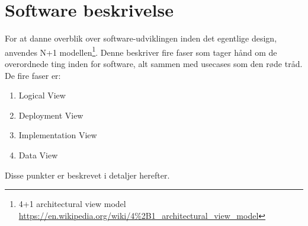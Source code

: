 \section{Software beskrivelse}

For at danne overblik over software-udviklingen inden det egentlige design, anvendes N+1 modellen\footnote{4+1 architectural view model \url{https://en.wikipedia.org/wiki/4\%2B1_architectural_view_model}}. Denne beskriver fire faser som tager hånd om de overordnede ting inden for software, alt sammen med usecases som den røde tråd. De fire faser er:
\begin{enumerate}
    \item Logical View
    \item Deployment View
    \item Implementation View 
    \item Data View
\end{enumerate}
Disse punkter er beskrevet i detaljer herefter.







